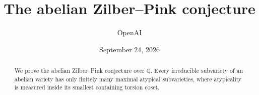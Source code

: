 \documentclass[11pt]{article}
\title{The abelian Zilber--Pink conjecture}
\author{OpenAI}
\date{September 24, 2026}
\begin{document}
\maketitle
\begin{abstract}
We prove the abelian Zilber--Pink conjecture over
$\overline{\mathbb Q}$. Every irreducible subvariety of an abelian variety
has only finitely many maximal atypical subvarieties, where atypicality
is measured inside its smallest containing torsion coset.
\end{abstract}
\begingroup
\setcounter{tocdepth}{1}
\tableofcontents
\endgroup
\clearpage












\end{document}
